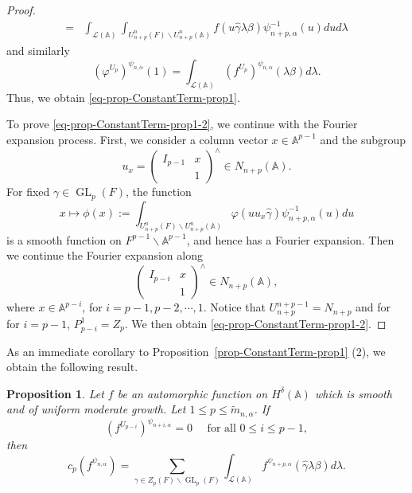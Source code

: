 \documentclass[12pt]{amsart}
\newcommand{\A}{\mathbb{A}}
\newcommand{\wt}{\widetilde}
\newtheorem{proposition}[theorem]{Proposition}%
\theoremstyle{remark}
\DeclareMathOperator{\GL}{GL}
\begin{document}
\begin{proof}
\begin{equation*}
\begin{split}
=& \int_{\mathcal{L}(\A)} \int_{U_{n+p}^{n}(F)\backslash U_{n+p}^{n}(\A)} f( u \hat{\gamma}   \lambda \beta )\psi_{n+p,\alpha}^{-1}(u  ) du   d\lambda
\end{split}
\end{equation*}
and similarly
\begin{equation*}
(\varphi^{U_p})^{\psi_{n,\alpha}}(1)=\int_{\mathcal{L}(\A)} (f^{U_p})^{\psi_{n,\alpha}}(\lambda \beta) d\lambda.	
\end{equation*}
Thus, we obtain \eqref{eq-prop-ConstantTerm-prop1}. 

To prove \eqref{eq-prop-ConstantTerm-prop1-2}, we continue with the Fourier expansion process. First, we consider a column vector $x\in \mathbb{A}^{p-1}$ and the subgroup
\begin{equation*}
u_x= \begin{pmatrix} I_{p-1} & x \\ & 1\end{pmatrix}^\wedge\in N_{n+p}(\A).
\end{equation*}
For fixed $\gamma\in \GL_p(F)$, the function
\begin{equation*}
x\mapsto \phi(x):=\int_{U_{n+p}^{n}(F)\backslash U_{n+p}^{n}(\A)} \varphi( u u_x \hat{\gamma})\psi_{n+p,\alpha}^{-1}(u)du
\end{equation*}
is a smooth function on $F^{p-1}\backslash \A^{p-1}$, and hence has a Fourier expansion. Then we continue the Fourier expansion along
\begin{equation*}
\begin{pmatrix} I_{p-i} & x \\ & 1\end{pmatrix}^\wedge\in N_{n+p}(\A),
\end{equation*}
where $x\in \A^{p-i}$, for $i=p-1, p-2, \cdots, 1$. Notice that $U_{n+p}^{n+p-1}=N_{n+p}$ and for  for $i=p-1$, $P_{p-i}^1=Z_p$. We then obtain \eqref{eq-prop-ConstantTerm-prop1-2}.
\end{proof}

As an immediate corollary to Proposition~\ref{prop-ConstantTerm-prop1} (2), we obtain the following result. 

\begin{proposition}
\label{prop-ConstantTerm-prop2}
Let $f$ be an automorphic function on $H^{\delta}(\A)$ which is smooth and of uniform moderate growth. Let $1\le p \le \wt m_{n,\alpha}$. If
\begin{equation*}
( f^{U_{p-i}} )^{\psi_{n+i,\alpha}} = 0 \quad \text{ for all }0\le i \le p-1,	
\end{equation*}
then
\begin{equation*}
c_p(f^{\psi_{n,\alpha}})=\sum_{\gamma\in Z_p(F)\backslash \GL_p(F)} \int_{\mathcal{L}(\A)}   f^{\psi_{n+p,\alpha}}(  \hat{\gamma}  \lambda \beta) d\lambda.
\end{equation*}
\end{proposition}
\end{document}
